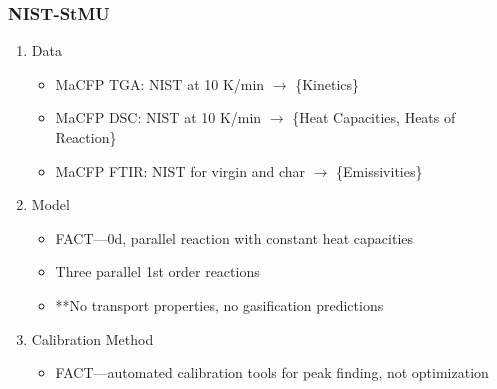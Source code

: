 \documentclass{article}
\begin{document}
\subsubsection*{NIST-StMU}
\begin{enumerate}
	\item Data
	\begin{itemize}
		\item MaCFP TGA: NIST at 10 K/min $\rightarrow$ \{Kinetics\}
		\item MaCFP DSC: NIST at 10 K/min $\rightarrow$ \{Heat Capacities, Heats of Reaction\}
		\item MaCFP FTIR: NIST for virgin and char $\rightarrow$ \{Emissivities\}
	\end{itemize}
	
	\item Model
	\begin{itemize}
		\item FACT---0d, parallel reaction with constant heat capacities
		\item Three parallel 1st order reactions
		\item **No transport properties, no gasification predictions
	\end{itemize}
	
	\item Calibration Method
	\begin{itemize}
		\item FACT---automated calibration tools for peak finding, not optimization
	\end{itemize}
\end{enumerate}
\end{document}
